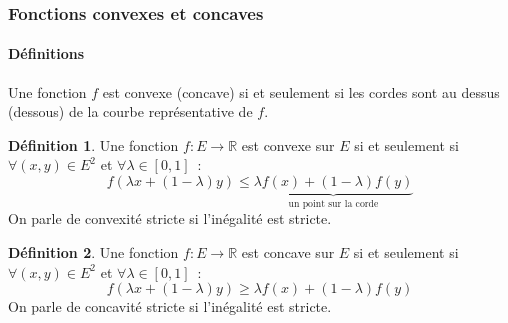 \documentclass[10pt,notheorems]{beamer}
\theoremstyle{plain}
\theoremstyle{definition} %
\newtheorem{definition}{Définition}
\begin{document}
\begin{frame}
  \frametitle{Fonctions convexes et concaves}
  \framesubtitle{Définitions}
  \hypertarget{slide_fonctions_convexes_1}{}
  \bigskip Une fonction $f$ est convexe (concave) si et seulement si
  les cordes sont au dessus (dessous) de la courbe représentative de
  $f$.

  {\small
  \begin{definition}\label{def:convexe}
    Une fonction $f:E\rightarrow \mathbb R$ est convexe sur $E$ si et seulement si $\forall (x,y)\in E^2$ et $\forall \lambda\in[0,1]$~:
    \[
      f(\lambda x + (1-\lambda)y) \leq \underbrace{\lambda f(x) + (1-\lambda)f(y)}_{\text{un point sur la corde}}
    \]
    On parle de convexité stricte si l'inégalité est stricte.
  \end{definition}

  \begin{definition}\label{def:concave}
    Une fonction $f:E\rightarrow \mathbb R$ est concave sur $E$ si et seulement si $\forall (x,y)\in E^2$ et $\forall \lambda\in[0,1]$~:
    \[
      f(\lambda x + (1-\lambda)y) \geq \lambda f(x) + (1-\lambda)f(y)
    \]
    On parle de concavité stricte si l'inégalité est stricte.
  \end{definition}
}
\end{frame}
\end{document}
